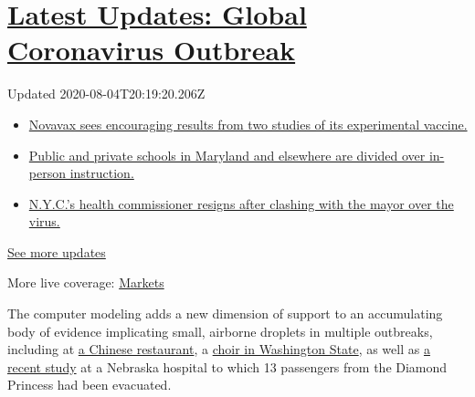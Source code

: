 \hypertarget{latest-updates-global-coronavirus-outbreak}{%
\section{\texorpdfstring{\href{https://www.nytimes3xbfgragh.onion/2020/08/04/world/coronavirus-cases.html?action=click\&pgtype=Article\&state=default\&region=MAIN_CONTENT_1\&context=storylines_live_updates}{Latest
Updates: Global Coronavirus
Outbreak}}{Latest Updates: Global Coronavirus Outbreak}}\label{latest-updates-global-coronavirus-outbreak}}

Updated 2020-08-04T20:19:20.206Z

\begin{itemize}
\tightlist
\item
  \href{https://www.nytimes3xbfgragh.onion/2020/08/04/world/coronavirus-cases.html?action=click\&pgtype=Article\&state=default\&region=MAIN_CONTENT_1\&context=storylines_live_updates\#link-1228a480}{Novavax
  sees encouraging results from two studies of its experimental
  vaccine.}
\item
  \href{https://www.nytimes3xbfgragh.onion/2020/08/04/world/coronavirus-cases.html?action=click\&pgtype=Article\&state=default\&region=MAIN_CONTENT_1\&context=storylines_live_updates\#link-4825b93}{Public
  and private schools in Maryland and elsewhere are divided over
  in-person instruction.}
\item
  \href{https://www.nytimes3xbfgragh.onion/2020/08/04/world/coronavirus-cases.html?action=click\&pgtype=Article\&state=default\&region=MAIN_CONTENT_1\&context=storylines_live_updates\#link-4d1eafa8}{N.Y.C.'s
  health commissioner resigns after clashing with the mayor over the
  virus.}
\end{itemize}

\href{https://www.nytimes3xbfgragh.onion/2020/08/04/world/coronavirus-cases.html?action=click\&pgtype=Article\&state=default\&region=MAIN_CONTENT_1\&context=storylines_live_updates}{See
more updates}

More live coverage:
\href{https://www.nytimes3xbfgragh.onion/live/2020/08/04/business/stock-market-today-coronavirus?action=click\&pgtype=Article\&state=default\&region=MAIN_CONTENT_1\&context=storylines_live_updates}{Markets}

The computer modeling adds a new dimension of support to an accumulating
body of evidence implicating small, airborne droplets in multiple
outbreaks, including at
\href{https://www.nytimes3xbfgragh.onion/2020/04/20/health/airflow-coronavirus-restaurants.html}{a
Chinese restaurant}, a
\href{https://www.medrxiv.org/content/10.1101/2020.06.15.20132027v2}{choir
in Washington State}, as well as
\href{https://www.nature.com/articles/s41598-020-69286-3}{a recent
study} at a Nebraska hospital to which 13 passengers from the Diamond
Princess had been evacuated.

